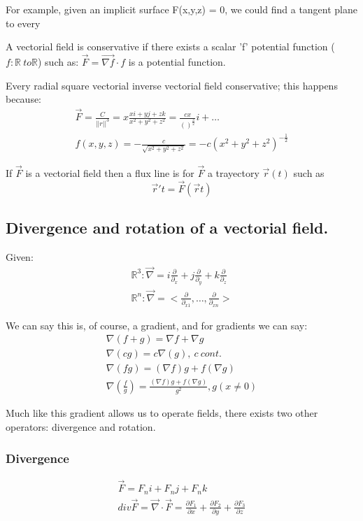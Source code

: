 \documentclass[11pt,fleqn]{book} %
\begin{document}
For example, given an implicit surface F(x,y,z) = 0, we could find a tangent plane to every 

A vectorial field is conservative if there exists a scalar 'f' potential function ($f: \mathbb{R} \ to \mathbb{R}$)
such as: 
$\vec{F} = \vec{\nabla f} \cdot f $ is a potential function.

Every radial square vectorial inverse vectorial field conservative; this happens because:
\begin{gather}
    \vec{F} = \frac{C}{||r||^3} = x \frac{xi+yj+zk}{x^2+y^2+z^2} = \frac{cx}{()^{\frac{3}{2}}}i + \dots \\
    f(x,y,z) = - \frac{c}{\sqrt{x^2+y^2+z^2}} = -c (x^2+y^2+z^2)^{-\frac{1}{2}}
\end{gather}

If $\vec{F}$ is a vectorial field then a flux line is for $\vec{F}$ a trayectory $\vec{r}(t)$ such as 
$$\vec{r}' t = \vec{F}(\vec{r}t)$$

\subsection{Divergence and rotation of a vectorial field.}

Given:
\begin{gather}
    \mathbb{R}^3: \vec{\nabla} = i \frac{\partial}{\partial_x} + j \frac{\partial}{\partial_y} + k \frac{\partial}{\partial_z} \\
    \mathbb{R}^n: \vec{\nabla} = <\frac{\partial}{\partial_{x1}}, \dots, \frac{\partial}{\partial_{xn}}>
\end{gather}

We can say this is, of course, a gradient, and for gradients we can say:
\begin{gather}
    \nabla(f+g) = \nabla f + \nabla g\\
    \nabla(cg) = c \nabla(g), \ c \ cont. \\
    \nabla(fg) = (\nabla f)g + f (\nabla g)\\
    \nabla(\frac{f}{g}) = \frac{(\nabla f)g + f (\nabla g)}{g^2}, g(x \neq 0)
\end{gather}

Much like this gradient allows us to operate fields, there exists two other operators: divergence and 
rotation.

\subsubsection{Divergence}
\begin{gather}
    \vec{F} = F_n i + F_n j + F_n k\\
    div \vec{F} = \vec{\nabla} \cdot \vec{F} = \frac{\partial F_1}{\partial x} + \frac{\partial F_2}{\partial y} + \frac{\partial F_3}{\partial z}
\end{gather}
\end{document}
